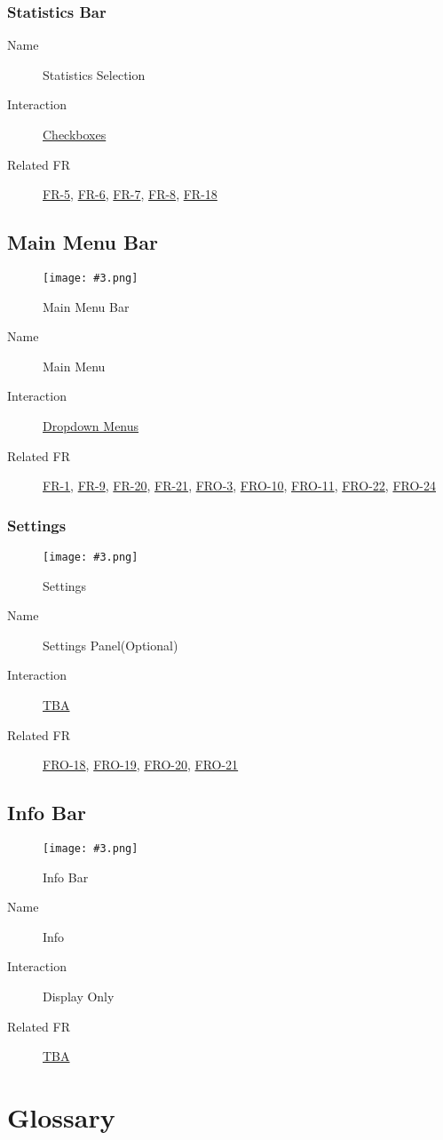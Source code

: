 \documentclass[10pt,a4paper]{report}
\newcommand{\refer}[2]{\hyperref[#1]{\textcolor{col:reference}{#2}}}
\newcommand{\h}[1]{\textcolor{col:highlight}{#1}}
\newcommand{\ui}[3]{
    \begin{description}
        \item[Name]{#1}
        \item[Interaction]{#2}
        \item[Related FR]{#3}
    \end{description}
}
\newcommand{\refg}[2]{\refer{glo:#1}{#2}}
\newcommand{\includeimage}[5]{
    \begin{figure}[H]
        #1
        \texttt{[image: \#3.png]}
        \caption{#4}
        \label{fig:#5}
    \end{figure}
}
\begin{document}
\subsection{Statistics Bar}
\label{sec:visualizer:statistics}
\ui{Statistics Selection}{\refer{it:checkbox}{Checkboxes}}{\refer{FR-5}{FR-5}, \refer{FR-6}{FR-6}, \refer{FR-7}{FR-7}, \refer{FR-8}{FR-8}, \refer{FR-18}{FR-18}}

\section{Main Menu Bar}
\label{sec:menu}
\includeimage{}{0.8}{Main Menu Bar}{Main Menu Bar}{Main Menu Bar}

\ui{Main Menu}{\refer{it:dropdown_menu}{Dropdown Menus}}{\refer{FR-1}{FR-1}, \refer{FR-9}{FR-9}, \refer{FR-20}{FR-20}, \refer{FR-21}{FR-21}, \refer{FRO-3}{FRO-3}, \refer{FRO-10}{FRO-10}, \refer{FRO-11}{FRO-11}, \refer{FRO-22}{FRO-22}, \refer{FRO-24}{FRO-24}}

\subsection{Settings}
\label{sec:settings}
\includeimage{}{0.5}{Settings Dialog}{Settings}{Settings}
\ui{Settings Panel(Optional)}{\refg{tba}{TBA}}{\refer{FRO-18}{FRO-18}, \refer{FRO-19}{FRO-19}, \refer{FRO-20}{FRO-20}, \refer{FRO-21}{FRO-21}}

\section{Info Bar}
\label{sec:info}
\includeimage{}{0.4}{Info Bar}{Info Bar}{Info Bar}

\ui{Info}{\h{Display Only}}{\refg{tba}{TBA}}

\chapter{Glossary}
\end{document}
